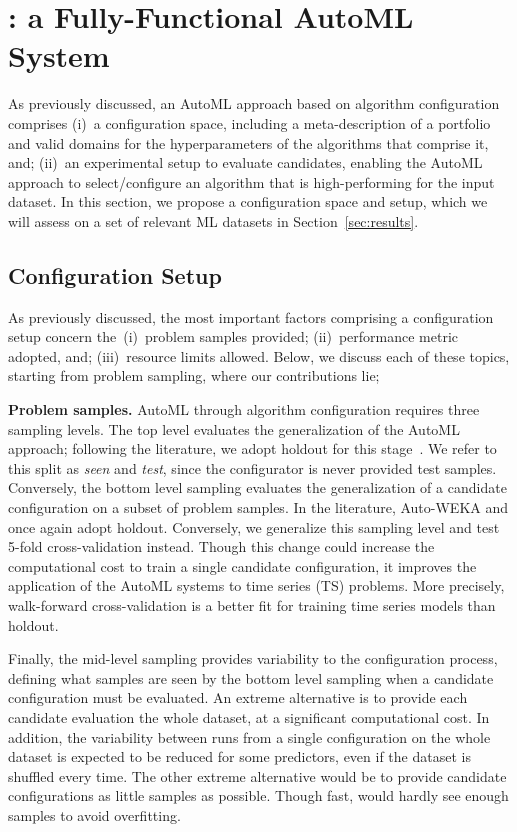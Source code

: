 \section{\isklearn: a Fully-Functional AutoML System}
\label{sec:isklearn}

As previously discussed, an AutoML approach based on algorithm configuration comprises (i)~a configuration space, including a meta-description of a portfolio and valid domains for the hyperparameters of the algorithms that comprise it, and; (ii)~an experimental setup to evaluate candidates, enabling the AutoML approach to select/configure an algorithm that is high-performing for the input dataset. In this section, we propose a configuration space and setup, which we will assess on a set of relevant ML datasets in Section~\ref{sec:results}.


%
%

\subsection{Configuration Setup}
\label{sec:config-setup}

As previously discussed, the most important factors comprising a configuration setup concern the~(i)~problem samples provided; (ii)~performance metric adopted, and; (iii)~resource limits allowed. Below, we discuss each of these topics, starting from problem sampling, where our contributions lie;

\textbf{Problem samples.} AutoML through algorithm configuration requires three sampling levels. The top level evaluates the generalization of the AutoML approach; following the literature, we adopt holdout for this stage~\cite{autoweka,auto-sklearn}. We refer to this split as \emph{seen} and \emph{test}, since the configurator is never provided test samples. Conversely, the bottom level sampling evaluates the generalization of a candidate configuration on a subset of problem samples. In the literature, Auto-WEKA and \autosklearn once again adopt holdout. Conversely, we generalize this sampling level and test 5-fold cross-validation instead. Though this change could increase the computational cost to train a single candidate configuration, it improves the application of the AutoML systems to time series (TS) problems. More precisely, walk-forward cross-validation is a better fit for training time series models than holdout.

Finally, the mid-level sampling provides variability to the configuration process, defining what samples are seen by the bottom level sampling when a candidate configuration must be evaluated. An extreme alternative is to provide each candidate evaluation the whole dataset, at a significant computational cost. In addition, the variability between runs from a single configuration on the whole dataset is expected to be reduced for some predictors, even if the dataset is shuffled every time. The other extreme alternative would be to provide candidate configurations as little samples as possible. %
Though fast, \irace would hardly see enough samples to avoid overfitting. %

